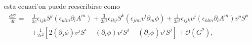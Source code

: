 %
esta ecuaci'on puede reescribirse como 
\begin{align}
\frac{dS^i}{dt} =& \frac{1}{2c}\epsilon_{ijk}S^j\left(\epsilon_{klm}\partial_l A^m\right)+\frac{3}{2c^2}\epsilon_{ikj}S^k\left(\epsilon_{jlm}v^l\partial_m\phi\right)
+ \frac{1}{2c^3}\epsilon_{ijk}v^j(\epsilon_{klm}\partial_l A^m)v^p S^p\nonumber\\
& +\frac{1}{2c^2}\left[2(\partial_j\phi)v^jS^i-(\partial_i\phi)v^jS^j -(\partial_j\phi)v^iS^j\right]+\mathcal{O}(G^2),\label{dlidt3}
\end{align}

